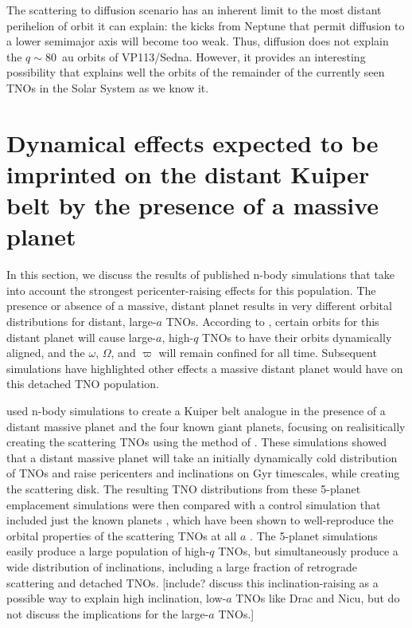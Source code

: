 \documentclass{aastex62}
\begin{document}
The scattering to diffusion scenario has an inherent limit to the most distant perihelion of orbit it can explain: the kicks from Neptune that permit diffusion to a lower semimajor axis will become too weak. 
Thus, diffusion does not explain the $q \sim 80$~au orbits of VP113/Sedna. 
However, it provides an interesting possibility that explains well the orbits of the remainder of the currently seen TNOs in the Solar System as we know it.

\section{Dynamical effects expected to be imprinted on the distant Kuiper belt by the presence of a massive planet}

In this section, we discuss the results of published n-body simulations that take into account the strongest pericenter-raising effects for this population.
The presence or absence of a massive, distant planet results in very different orbital distributions for distant, large-$a$ TNOs.  
According to \citet{batyginbrown16}, certain orbits for this distant planet will cause large-$a$, high-$q$ TNOs to have their orbits dynamically aligned, and the $\omega$, $\Omega$, and $\varpi$ will remain confined for all time.
Subsequent simulations have highlighted other effects a massive distant planet would have on this detached TNO population.

\citet{lawler2017} used n-body simulations to create a Kuiper belt analogue in the presence of a distant massive planet and the four known giant planets, focusing on realisitically creating the scattering TNOs using the method of \citet{kaib11b}.  
These simulations showed that a distant massive planet will take an initially dynamically cold distribution of TNOs and raise pericenters and inclinations on Gyr timescales, while creating the scattering disk.
The resulting TNO distributions from these 5-planet emplacement simulations were then compared with a control simulation that included just the known planets \citep{kaib11b}, which have been shown to well-reproduce the orbital properties of the scattering TNOs at all $a$ \citep{shankman13,lawler2018scat}. 
The 5-planet simulations easily produce a large population of high-$q$ TNOs, but simultaneously produce a wide distribution of inclinations, including a large fraction of retrograde scattering and detached TNOs.
[include? \citet{batyginbrown16b} discuss this inclination-raising as a possible way to explain high inclination, low-$a$ TNOs like Drac and Nicu, but do not discuss the implications for the large-$a$ TNOs.]
\end{document}
